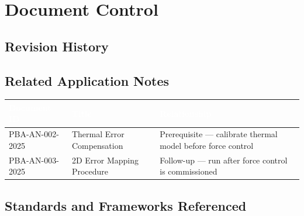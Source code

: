 
\section*{Document Control}
\label{sec:doccontrol}

\subsection*{Revision History}

\makedoccontrol

\bigskip

\subsection*{Related Application Notes}

\begin{center}
\begin{tabularx}{\textwidth}{@{} l l X @{}}
  \toprule
  \rowcolor{PBATableHeader}
  \textcolor{white}{\bfseries Document ID} &
  \textcolor{white}{\bfseries Title} &
  \textcolor{white}{\bfseries Relationship} \\
  \midrule
  PBA-AN-002-2025 & Thermal Error Compensation & Prerequisite — calibrate thermal model before force control \\
  \rowcolor{PBALightGray}
  PBA-AN-003-2025 & 2D Error Mapping Procedure & Follow-up — run after force control is commissioned \\
  \bottomrule
\end{tabularx}
\end{center}

\bigskip

\subsection*{Standards and Frameworks Referenced}

